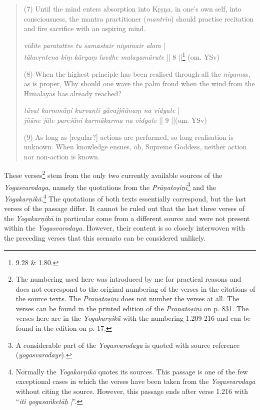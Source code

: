 \begin{quote}
(7) Until the mind enters absorption into Kṛṣṇa, in one's own self, into consciousness,
the mantra practitioner (\textit{mantrin}) should practise recitation and fire sacrifice with an aspiring mind. 

\textit{vidite paratattve tu samastair niyamair alam} |\\
\textit{tālavṛntena kiṃ kāryaṃ lavdhe malayamārute} || 8 ||\footnote{\approx {} 9.28 \&  1.80.} (om. YSv) 

(8) When the highest principle has been realised through all the \textit {niyama}s, as is proper,
Why should one wave the palm frond when the wind from the Himalayas has already reached?

\textit{tāvat karmmāṇi kurvanti yāvajjñānaṃ na vidyate} |\\ 
\textit{jñāne jāte pareśāni karmākarma na vidyate} || 9 ||(om. YSv) 

(9) As long as [regular?] actions are performed, so long realisation is unknown.
When knowledge ensues, oh, Supreme Goddess, neither action nor non-action is known.
\end{quote}

These verses\footnote{The numbering used here was introduced by me for practical reasons and does not correspond to the original numbering of the verses in the citations of the source texts. The \textit{Prāṇatoṣiṇī} does not number the verses at all. The verses can be found in the printed edition of the \textit{Prāṇatoṣiṇī} on p. 831. The verses here are in the \textit{Yogakarṇikā} with the numbering 1.209-216 and can be found in the edition on p. 17.} stem from the only two currently available sources of the \textit{Yogasvarodaya}, namely the quotations from the \textit{Prāṇatoṣiṇī}\footnote{A considerable part of the \textit{Yogasvarodaya} is quoted with source reference (\textit{yogasvarodaye}).} and the \textit{Yogakarṇikā}.\footnote{Normally the \textit{Yogakarṇikā} quotes its sources. This passage is one of the few exceptional cases in which the verses have been taken from the \textit{Yogasvarodaya} without citing the source. However, this passage ends after verse 1.216 with ``\textit{iti yogasaṅketāḥ |}''.} The quotations of both texts essentially correspond, but the last verses of the passage differ. It cannot be ruled out that the last three verses of the \textit{Yogakarṇikā} in particular come from a different source and were not present within the \textit{Yogasvarodaya}. However, their content is so closely interwoven with the preceding verses that this scenario can be considered unlikely.

